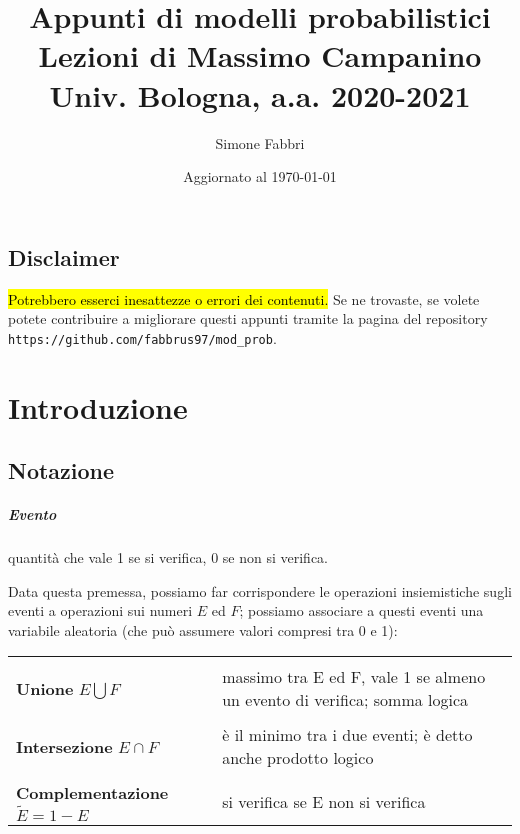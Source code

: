 \documentclass[a4paper,12pt]{book}
\begin{document}
	
\newcommand{\formule}[2]{
	\par\medskip\noindent%
	\begin{tabular*}{\linewidth}{@{}
			>{\centering$\displaystyle}p{\dimexpr0.24\linewidth-2\tabcolsep}<{$} %
			m{\dimexpr0.56\linewidth-2\tabcolsep}
			@{}}
		#1 & #2  
	\end{tabular*}\par\medskip\noindent}


\author{Simone Fabbri}
\title{%
	Appunti di modelli probabilistici \\
	\large Lezioni di Massimo Campanino \\
	Univ. Bologna, a.a. 2020-2021}

\date{Aggiornato al \today}

\frontmatter
\maketitle

\section*{Disclaimer}
\hl{Potrebbero esserci inesattezze o errori dei contenuti.} Se ne trovaste, se volete potete contribuire a migliorare questi appunti tramite la pagina del repository \texttt{https://github.com/fabbrus97/mod\_prob}. 

\tableofcontents

\mainmatter
%
%
\chapter{Introduzione}
\section{Notazione}
\paragraph{Evento} quantità che vale 1 se si verifica, 0 se non si verifica. 

Data questa premessa, possiamo far corrispondere le operazioni insiemistiche sugli eventi a operazioni sui numeri $ E $ ed $ F $; possiamo associare a questi eventi una variabile aleatoria (che può assumere valori compresi tra 0 e 1):

\begin{center}
	\begin{tabular}{ p{4cm}|p{9cm} }	
		\hline
		\\
		\textbf{Unione} $ E \bigcup F $ & massimo tra E ed F, vale 1 se almeno un evento di verifica; somma logica \\
		\hline
		\\
		\textbf{Intersezione} $ E \cap F $ & è il minimo tra i due eventi; è detto anche prodotto logico \\
		\hline
		\\
		\textbf{Complementazione} $\widetilde{E} = 1 - E$ & si verifica se E non si verifica \\
		\hline
	\end{tabular}
\end{center}
\end{document}
